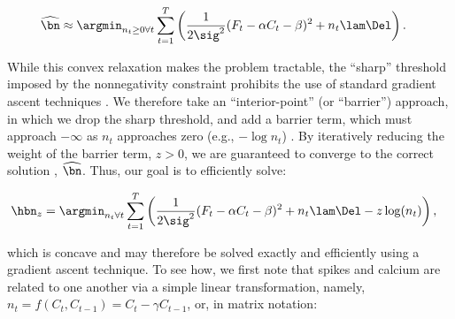 \documentclass[12pt]{article}
\newcommand{\zzz}{z}
\newcommand{\an}{\argmin_{n_t \geq 0 \forall t}}
\newcommand{\hnm}{\widehat{\bn}}
\begin{document}
\begin{align} \label{eq:obj2}
\hnm &\approx \an  \sum_{t=1}^T \left( \frac{1}{2 \sig^2}(F_t -\alpha C_t - \beta)^2  +  n_t  \lam \Del \right).
\end{align}

While this convex relaxation makes the problem tractable, the ``sharp'' threshold imposed by the nonnegativity constraint prohibits the use of standard gradient ascent techniques \cite{CONV04}. We therefore take an ``interior-point'' (or ``barrier'') approach, in which we drop the sharp threshold, and add a barrier term, which must approach $-\infty$ as $n_t$ approaches zero (e.g., $-\log n_t$) \cite{CONV04}.  By iteratively reducing the weight of the barrier term, $\zzz > 0$, we are guaranteed to converge to the correct solution \cite{CONV04}, $\hnm$.  Thus, our goal is to efficiently solve:

\begin{align} \label{eq:eta}
\hbn_{\zzz} &= \argmin_{n_t \forall t}  \sum_{t=1}^T \left( \frac{1}{2 \sig^2}(F_t -\alpha C_t - \beta)^2  +  n_t  \lam \Del - \zzz \log(n_t) \right),
\end{align}

\noindent which is concave and may therefore be solved exactly and efficiently using a gradient ascent technique. To see how, we first note that   
spikes and calcium are related to one another via a simple linear transformation, namely, $n_t=f(C_t,C_{t-1})= C_t - \gamma C_{t-1}$, or, in matrix notation: 
\end{document}
